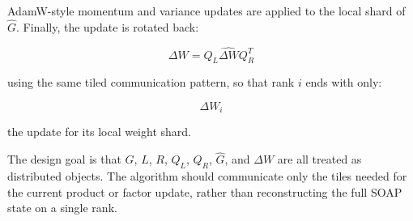 \documentclass[10pt]{article}
\begin{document}
AdamW-style momentum and variance updates are applied to the local shard of $\widehat{G}$. Finally, the update is rotated back:

$$
\Delta W = Q_L \widehat{\Delta W} Q_R^T
$$

using the same tiled communication pattern, so that rank $i$ ends with only:

$$
\Delta W_i
$$

the update for its local weight shard.

The design goal is that $G$, $L$, $R$, $Q_L$, $Q_R$, $\widehat{G}$, and $\Delta W$ are all treated as distributed objects. The algorithm should communicate only the tiles needed for the current product or factor update, rather than reconstructing the full SOAP state on a single rank.
\end{document}
